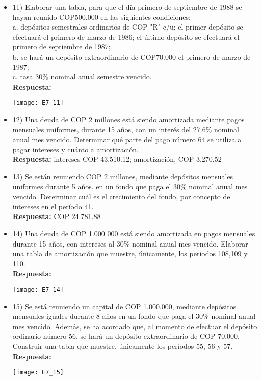 \begin{itemize}
 \item 11)	 Elaborar una tabla, para que el día primero de septiembre de 1988 se hayan reunido COP500.000 en las siguientes condiciones:\\
       a.	depósitos semestrales ordinarios de  COP  "R" c/u; el primer depósito se efectuará el primero de marzo de 1986; el último depósito se efectuará el primero de septiembre de 1987; \\
       b.	se hará un depósito extraordinario de COP70.000 el primero de marzo de 1987;\\
       c.	tasa 30\% nominal anual semestre vencido.\\
       \textbf{Respuesta:}
       \begin{center}
        \texttt{[image: E7\_11]}
       \end{center}
       \medskip

 \item 12)	 Una deuda de COP 2 millones está siendo amortizada mediante pagos mensuales uniformes, durante 15 años, con un interés del 27.6\% nominal anual mes vencido. Determinar qué parte del pago número 64 se utiliza a pagar intereses y cuánto a amortización.\\
       \textbf{ Respuesta:} intereses COP 43.510.12; amortización, COP 3.270.52
       \medskip

 \item 13)	 Se están reuniendo COP 2 millones, mediante depósitos mensuales uniformes durante 5 años, en un fondo que paga el 30\% nominal anual mes vencido. Determinar cuál es el crecimiento del fondo, por concepto de intereses en el período 41. \\
       \textbf{Respuesta:} COP 24.781.88
       \medskip

 \item 14)	 Una deuda de COP 1.000 000 está siendo amortizada en pagos mensuales durante 15 años, con intereses al 30\% nominal anual mes vencido. Elaborar una tabla de amortización que muestre, únicamente, los períodos 108,109 y 110.\\
       \textbf{Respuesta:}
       \begin{center}
        \texttt{[image: E7\_14]}
       \end{center}
       \medskip

 \item 15)	 Se está reuniendo un capital de COP 1.000.000, mediante depósitos mensuales iguales durante 8 años en un fondo que paga el 30\% nominal anual mes vencido. Además, se ha acordado que, al momento de efectuar el depósito ordinario número 56, se hará un depósito extraordinario de COP 70.000. Construir una tabla que muestre, únicamente los períodos 55, 56 y 57.\\
       \textbf{Respuesta:}
       \begin{center}
        \texttt{[image: E7\_15]}
       \end{center}
       \medskip


\end{itemize}
